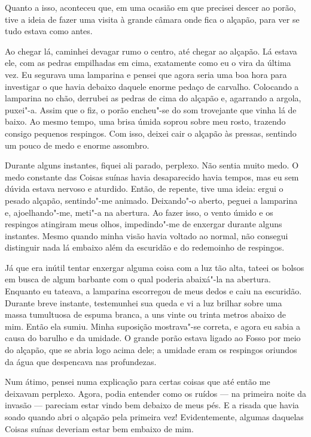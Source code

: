 Quanto a isso, aconteceu que, em uma ocasião em que precisei descer ao porão, tive a ideia de fazer uma visita à grande
câmara onde fica o alçapão, para ver se tudo estava como antes.

Ao chegar lá, caminhei devagar rumo o centro, até chegar ao alçapão. Lá estava ele, com as pedras empilhadas em
cima, exatamente como eu o vira da última vez. Eu segurava uma lamparina e pensei que agora seria uma boa hora para
investigar o que havia debaixo daquele enorme pedaço de carvalho. Colocando a lamparina no chão, derrubei as pedras de
cima do alçapão e, agarrando a argola, puxei"-a. Assim que o fiz, o porão encheu"-se do som trovejante que vinha lá de
baixo. Ao mesmo tempo, uma brisa úmida soprou sobre meu rosto, trazendo consigo pequenos respingos. Com isso, deixei
cair o alçapão às pressas, sentindo um pouco de medo e enorme assombro.

Durante alguns instantes, fiquei ali parado, perplexo. Não sentia muito medo. O medo constante das Coisas suínas havia
desaparecido havia tempos, mas eu sem dúvida estava nervoso e aturdido. Então, de repente, tive uma ideia: ergui o
pesado alçapão, sentindo"-me animado. Deixando"-o aberto, peguei a lamparina e, ajoelhando"-me, meti"-a na abertura. Ao
fazer isso, o vento úmido e os respingos atingiram meus olhos, impedindo"-me de enxergar durante alguns instantes. Mesmo
quando minha visão havia voltado ao normal, não consegui distinguir nada lá embaixo além da escuridão e do redemoinho
de respingos.

Já que era inútil tentar enxergar alguma coisa com a luz tão alta, tateei os bolsos em busca de algum barbante com o
qual poderia abaixá"-la na abertura. Enquanto eu tateava, a lamparina escorregou de meus dedos e caiu na escuridão.
Durante breve instante, testemunhei sua queda e vi a luz brilhar sobre uma massa tumultuosa de espuma branca, a uns
vinte ou trinta metros abaixo de mim. Então ela sumiu. Minha suposição mostrava"-se correta, e agora eu sabia a causa
do barulho e da umidade. O grande porão estava ligado ao Fosso por meio do alçapão, que se abria logo acima dele; a
umidade eram os respingos oriundos da água que despencava nas profundezas.

Num átimo, pensei numa explicação para certas coisas que até então me deixavam perplexo. Agora, podia entender como os
ruídos --- na primeira noite da invasão --- pareciam estar vindo bem debaixo de meus pés. E a risada que havia soado quando
abri o alçapão pela primeira vez! Evidentemente, algumas daquelas Coisas suínas deveriam estar bem embaixo de mim.

